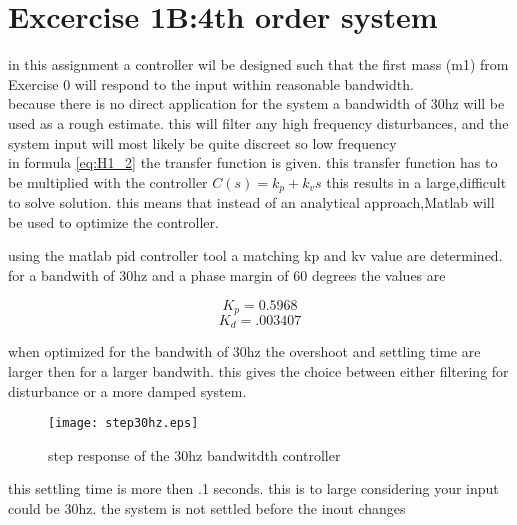 
\chapter{Excercise 1B:4th order system}
in this assignment a controller wil be designed such that the first mass (m1) from Exercise 0 will respond to the input within reasonable bandwidth.\\
because there is no direct application for the system a bandwidth of 30hz will be used as a rough estimate. this will filter any high frequency disturbances, and the system input will most likely be quite discreet so low frequency\\
in formula \eqref{eq:H1_2} the transfer function is given. this transfer function has to be multiplied with the controller $C(s)=k_p+k_vs$ this results in a large,difficult to solve solution. this means that instead of an analytical approach,Matlab will be used to optimize the controller.

using the matlab pid controller tool a matching kp and kv value are determined.
for a bandwith of 30hz and a phase margin of 60 degrees the values are


	\begin{equation}
K_p=0.5968
	\end{equation}\break
	\begin{equation}
K_d=.003407
	\end{equation}

when optimized for the bandwith of 30hz the overshoot and settling time are larger then for a larger bandwith. this gives the choice between either filtering for disturbance or a more damped system.
\begin{figure}[H] 
	\texttt{[image: step30hz.eps]}
	\centering
	\caption{step response of the 30hz bandwitdth controller}
	\label{fig:intro_system}
\end{figure}

this settling time is more then .1 seconds.
this is to large considering your input could be 30hz. the system is not settled before the inout changes

